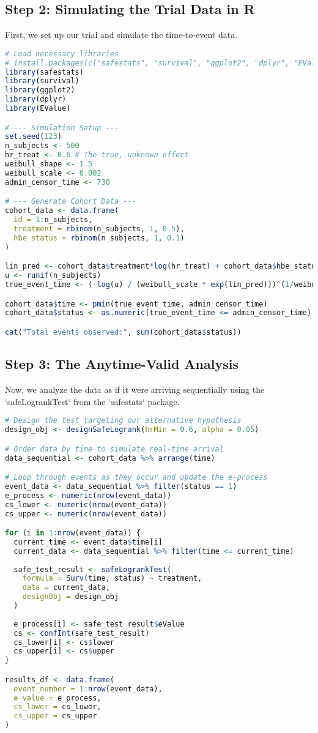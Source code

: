 \documentclass[11pt]{article}
\begin{document}
\subsection*{Step 2: Simulating the Trial Data in R}
First, we set up our trial and simulate the time-to-event data.
\begin{lstlisting}[language=R]
# Load necessary libraries
# install.packages(c("safestats", "survival", "ggplot2", "dplyr", "EValue"))
library(safestats)
library(survival)
library(ggplot2)
library(dplyr)
library(EValue)

# --- Simulation Setup ---
set.seed(123)
n_subjects <- 500
hr_treat <- 0.6 # The true, unknown effect
weibull_shape <- 1.5
weibull_scale <- 0.002
admin_censor_time <- 730

# --- Generate Cohort Data ---
cohort_data <- data.frame(
  id = 1:n_subjects,
  treatment = rbinom(n_subjects, 1, 0.5),
  hbe_status = rbinom(n_subjects, 1, 0.1)
)

lin_pred <- cohort_data$treatment*log(hr_treat) + cohort_data$hbe_status*log(0.8)
u <- runif(n_subjects)
true_event_time <- (-log(u) / (weibull_scale * exp(lin_pred)))^(1/weibull_shape)

cohort_data$time <- pmin(true_event_time, admin_censor_time)
cohort_data$status <- as.numeric(true_event_time <= admin_censor_time)

cat("Total events observed:", sum(cohort_data$status))
\end{lstlisting}

\subsection*{Step 3: The Anytime-Valid Analysis}
Now, we analyze the data as if it were arriving sequentially using the `safeLogrankTest` from the `safestats` package.
\begin{lstlisting}[language=R]
# Design the test targeting our alternative hypothesis
design_obj <- designSafeLogrank(hrMin = 0.6, alpha = 0.05)

# Order data by time to simulate real-time arrival
data_sequential <- cohort_data %>% arrange(time)

# Loop through events as they occur and update the e-process
event_data <- data_sequential %>% filter(status == 1)
e_process <- numeric(nrow(event_data))
cs_lower <- numeric(nrow(event_data))
cs_upper <- numeric(nrow(event_data))

for (i in 1:nrow(event_data)) {
  current_time <- event_data$time[i]
  current_data <- data_sequential %>% filter(time <= current_time)
  
  safe_test_result <- safeLogrankTest(
    formula = Surv(time, status) ~ treatment,
    data = current_data,
    designObj = design_obj
  )
  
  e_process[i] <- safe_test_result$eValue
  cs <- confInt(safe_test_result)
  cs_lower[i] <- cs$lower
  cs_upper[i] <- cs$upper
}

results_df <- data.frame(
  event_number = 1:nrow(event_data),
  e_value = e_process,
  cs_lower = cs_lower,
  cs_upper = cs_upper
)
\end{lstlisting}
\end{document}
